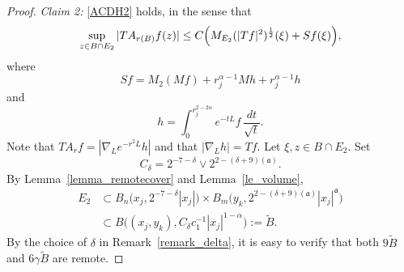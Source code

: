 \documentclass[12pt]{amsart}
\begin{document}
\begin{proof}
\textit{Claim 2:} \eqref{ACDH2} holds, in the sense that
\begin{equation*}
    \sup_{z\in B\cap E_2} |TA_{r(B)}f(z)| \le C\Bigl( M_{E_2}(|Tf|^2)^{\frac{1}{2}}(\xi) + Sf(\xi) \Bigr),
\end{equation*}
where
\begin{equation*}
    Sf = M_2( Mf ) + r_j^{\alpha-1} Mh + r_j^{\alpha-1} h
\end{equation*}
and
\begin{equation*}
    h = \int_0^{r_j^{2-2\alpha}}e^{-tL}f \, \frac{dt}{\sqrt{t}}.
\end{equation*}
Note that $TA_r f = |\nabla_L e^{-r^2L}h|$ and that $|\nabla_L h| = Tf$. Let $\xi,z \in B \cap E_2$. Set
\begin{equation*}
    C_\delta = 2^{-7-\delta} \vee 2^{2-(\delta+9)(\mathfrak a)}.
\end{equation*}
By Lemma~\ref{lemma_remotecover} and Lemma~\ref{le_volume},
\begin{align}\label{B}
    E_2
    &\subset B_n\bigl( x_j, 2^{-7-\delta}|x_j| \bigr) \times B_m\bigl( y_k, 2^{2-(\delta+9)(\mathfrak a)} |x_j|^{\mathfrak a} \bigr)\nonumber\\
    &\subset B\bigl( (x_j,y_k), C_\delta c_1^{-1} |x_j|^{1-\alpha} \bigr):= \widetilde{B}.
\end{align}
By the choice of $\delta$ in Remark~\ref{remark_delta}, it is easy to verify that both $9\widetilde{B}$ and $6\gamma \widetilde{B}$ are remote.


\end{proof}
\end{document}
